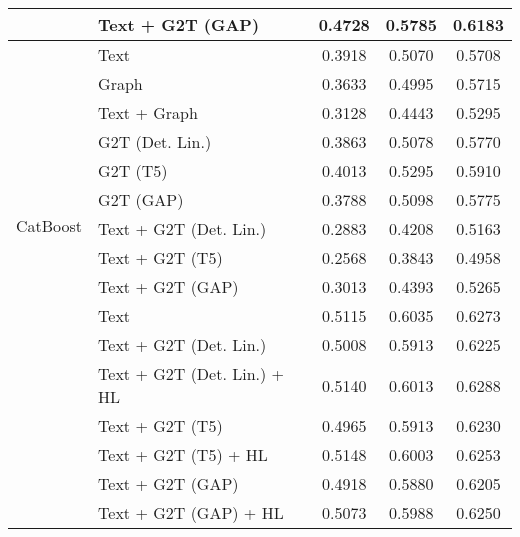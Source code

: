 \begin{table}[htbp]
\begin{tabular}{l p{5cm} c c c}
        & Text + G2T (GAP) & 0.4728 & 0.5785 & 0.6183 \\
        \midrule
        \multirow{12}{*}{CatBoost} & Text & 0.3918 & 0.5070 & 0.5708 \\
        & Graph & 0.3633 & 0.4995 & 0.5715 \\
        & Text + Graph & 0.3128 & 0.4443 & 0.5295 \\
        & G2T (Det. Lin.) & 0.3863 & 0.5078 & 0.5770 \\
        & G2T (T5) & 0.4013 & 0.5295 & 0.5910 \\
        & G2T (GAP) & 0.3788 & 0.5098 & 0.5775 \\
        & Text + G2T (Det. Lin.) & 0.2883 & 0.4208 & 0.5163 \\
        & Text + G2T (T5) & 0.2568 & 0.3843 & 0.4958 \\
        & Text + G2T (GAP) & 0.3013 & 0.4393 & 0.5265 \\
        \midrule
        \multirow{10}{*}{MPNet} & Text & 0.5115 & 0.6035 & 0.6273 \\
        & Text + G2T (Det. Lin.) & 0.5008 & 0.5913 & 0.6225 \\
        & Text + G2T (Det. Lin.) + HL & 0.5140 & 0.6013 & 0.6288 \\
        & Text + G2T (T5) & 0.4965 & 0.5913 & 0.6230 \\
        & Text + G2T (T5) + HL & 0.5148 & 0.6003 & 0.6253 \\
        & Text + G2T (GAP) & 0.4918 & 0.5880 & 0.6205 \\
        & Text + G2T (GAP) + HL & 0.5073 & 0.5988 & 0.6250 \\
        \bottomrule
    \end{tabular}
\end{table}

